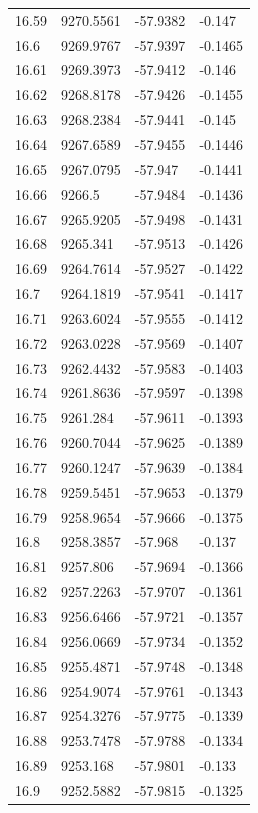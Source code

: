 \begin{table}[H]
\begin{tabular}{llll}
16.59 & 9270.5561 & -57.9382 & -0.147 \\
16.6 & 9269.9767 & -57.9397 & -0.1465 \\
16.61 & 9269.3973 & -57.9412 & -0.146 \\
16.62 & 9268.8178 & -57.9426 & -0.1455 \\
16.63 & 9268.2384 & -57.9441 & -0.145 \\
16.64 & 9267.6589 & -57.9455 & -0.1446 \\
16.65 & 9267.0795 & -57.947 & -0.1441 \\
16.66 & 9266.5 & -57.9484 & -0.1436 \\
16.67 & 9265.9205 & -57.9498 & -0.1431 \\
16.68 & 9265.341 & -57.9513 & -0.1426 \\
16.69 & 9264.7614 & -57.9527 & -0.1422 \\
16.7 & 9264.1819 & -57.9541 & -0.1417 \\
16.71 & 9263.6024 & -57.9555 & -0.1412 \\
16.72 & 9263.0228 & -57.9569 & -0.1407 \\
16.73 & 9262.4432 & -57.9583 & -0.1403 \\
16.74 & 9261.8636 & -57.9597 & -0.1398 \\
16.75 & 9261.284 & -57.9611 & -0.1393 \\
16.76 & 9260.7044 & -57.9625 & -0.1389 \\
16.77 & 9260.1247 & -57.9639 & -0.1384 \\
16.78 & 9259.5451 & -57.9653 & -0.1379 \\
16.79 & 9258.9654 & -57.9666 & -0.1375 \\
16.8 & 9258.3857 & -57.968 & -0.137 \\
16.81 & 9257.806 & -57.9694 & -0.1366 \\
16.82 & 9257.2263 & -57.9707 & -0.1361 \\
16.83 & 9256.6466 & -57.9721 & -0.1357 \\
16.84 & 9256.0669 & -57.9734 & -0.1352 \\
16.85 & 9255.4871 & -57.9748 & -0.1348 \\
16.86 & 9254.9074 & -57.9761 & -0.1343 \\
16.87 & 9254.3276 & -57.9775 & -0.1339 \\
16.88 & 9253.7478 & -57.9788 & -0.1334 \\
16.89 & 9253.168 & -57.9801 & -0.133 \\
16.9 & 9252.5882 & -57.9815 & -0.1325 \\

\end{tabular}
\end{table}
